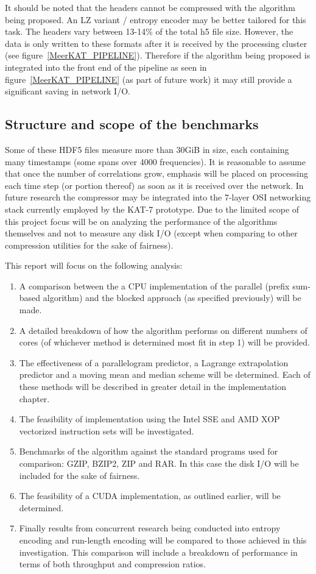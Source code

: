 It should be noted that the headers cannot be compressed with the algorithm being proposed. An LZ variant / entropy encoder may be better tailored for this task. 
The headers vary between 13-14\% of the total h5 file size. However, the data is only written to these formats after it is received by the processing cluster (see 
figure~\ref{MeerKAT_PIPELINE}). Therefore if the algorithm being proposed is integrated into the front end of the pipeline as seen in figure~\ref{MeerKAT_PIPELINE} (as part of 
future work) it may still provide a significant saving in network I/O. 
\subsection{Structure and scope of the benchmarks}
Some of these HDF5 files measure more than 30GiB in size, each containing many timestamps (some spans over 4000 frequencies). It is reasonable to assume that once the number of correlations grow, emphasis will be placed on processing each 
time step (or portion thereof) as soon as it is received over the network. In future research the compressor may be integrated into the 7-layer OSI networking stack currently employed by the KAT-7 prototype. Due to the limited
scope of this project focus will be on analyzing the performance of the algorithms themselves and not to measure any disk I/O (except when comparing to other compression utilities for the sake of fairness).

This report will focus on the following analysis:
\begin{enumerate}
 \item A comparison between the a CPU implementation of the parallel (prefix sum-based algorithm) and the blocked approach (as specified previously) will be made.
 \item A detailed breakdown of how the algorithm performs on different numbers of cores (of whichever method is determined most fit in step 1) will be provided.
 \item The effectiveness of a parallelogram predictor, a Lagrange extrapolation predictor \cite{engelson2000lossless} and a moving mean and median scheme will be determined. 
       Each of these methods will be described in greater detail in the implementation chapter.
 \item The feasibility of implementation using the Intel SSE and AMD XOP vectorized instruction sets will be investigated.
 \item Benchmarks of the algorithm against the standard programs used for comparison: GZIP, BZIP2, ZIP and RAR. In this case the disk I/O will be included for the sake of fairness.
 \item The feasibility of a CUDA implementation, as outlined earlier, will be determined.
 \item Finally results from concurrent research being conducted into entropy encoding and run-length encoding will be compared to those achieved in this investigation. This comparison will include a 
       breakdown of performance in terms of both throughput and compression ratios.
\end{enumerate}

